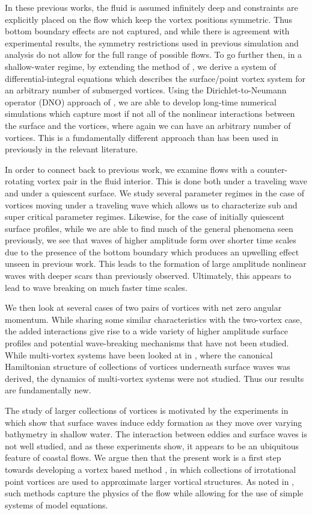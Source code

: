\documentclass[a4paper,11pt]{article}
\begin{document}
In these previous works, the fluid is assumed infinitely deep and constraints are explicitly placed on the flow which keep the vortex positions symmetric.  Thus bottom boundary effects are not captured, and while there is agreement with experimental results, the symmetry restrictions used in previous simulation and analysis do not allow for the full range of possible flows.  To go further then, in a shallow-water regime, by extending the method of \cite{afm}, we derive a system of differential-integral equations which describes the surface/point vortex system for an arbitrary number of submerged vortices.  Using the Dirichlet-to-Neumann operator (DNO) approach of \cite{craig,guyenne}, we are able to develop long-time numerical simulations which capture most if not all of the nonlinear interactions between the surface and the vortices, where again we can have an arbitrary number of vortices.  This is a fundamentally  different approach than has been used in previously in the relevant literature.  

In order to connect back to previous work, we examine flows with a counter-rotating vortex pair in the fluid interior.  This is done both under a traveling wave and under a quiescent surface.  We study several parameter regimes in the case of vortices moving under a traveling wave which allows us to characterize sub and super critical parameter regimes.  Likewise, for the case of initially quiescent surface profiles, while we are able to find much of the general phenomena seen previously, we see that waves of higher amplitude form over shorter time scales due to the presence of the bottom boundary which produces an upwelling effect unseen in previous work.  This leads to the formation of large amplitude nonlinear waves with deeper scars than previously observed.  Ultimately, this appears to lead to wave breaking on much faster time scales.    

We then look at several cases of two pairs of vortices with net zero angular momentum.  While sharing some similar characteristics with the two-vortex case, the added interactions give rise to a wide variety of higher amplitude surface profiles and potential wave-breaking mechanisms that have not been studied.  While multi-vortex systems have been looked at in \cite{rouhi}, where the canonical Hamiltonian structure of collections of vortices underneath surface waves was derived, the dynamics of multi-vortex systems were not studied.  Thus our results are fundamentally new. 

The study of larger collections of vortices is motivated by the experiments in \cite{lin,liu1,liu2} which show that surface waves induce eddy formation as they move over varying bathymetry in shallow water.  The interaction between eddies and surface waves is not well studied, and as these experiments show, it appears to be an ubiquitous feature of coastal flows.  We argue then that the present work is a first step towards developing a vortex based method \cite{cottet}, in which collections of irrotational point vortices are used to approximate larger vortical structures.  As noted in \cite{cottet}, such methods capture the physics of the flow while allowing for the use of simple systems of model equations.     
\end{document}
